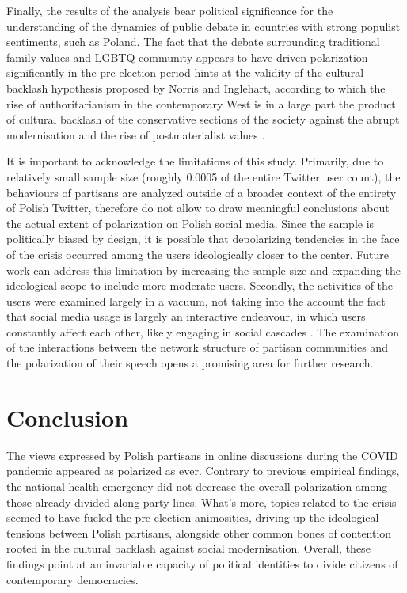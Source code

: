 \documentclass{article}
\begin{document}
	Finally, the results of the analysis bear political significance for the understanding of the dynamics of public debate in countries with strong populist sentiments, such as Poland. The fact that the debate surrounding traditional family values and LGBTQ community appears to have driven polarization significantly in the pre-election period hints at the validity of the cultural backlash hypothesis proposed by Norris and Inglehart, according to which the rise of authoritarianism in the contemporary West is in a large part the product of cultural backlash of the conservative sections of the society against the abrupt modernisation and the rise of postmaterialist values \citep{norris2019}.
	
	It is important to acknowledge the limitations of this study. Primarily, due to relatively small sample size (roughly 0.0005 of the entire Twitter user count), the behaviours of partisans are analyzed outside of a broader context of the entirety of Polish Twitter, therefore do not allow to draw meaningful conclusions about the actual extent of polarization on Polish social media. Since the sample is politically biased by design, it is possible that depolarizing tendencies in the face of the crisis occurred among the users ideologically closer to the center. Future work can address this limitation by increasing the sample size and expanding the ideological scope to include more moderate users. Secondly, the activities of the users were examined largely in a vacuum, not taking into the account the fact that social media usage is largely an interactive endeavour, in which users constantly affect each other, likely engaging in social cascades \citep{sunstein2001, mas2013}. The examination of the interactions between the network structure of partisan communities and the polarization of their speech opens a promising area for further research.
	
	\section*{Conclusion}
	
	The views expressed by Polish partisans in online discussions during the COVID pandemic appeared as polarized as ever. Contrary to previous empirical findings, the national health emergency did not decrease the overall polarization among those already divided along party lines. What’s more, topics related to the crisis seemed to have fueled the pre-election animosities, driving up the ideological tensions between Polish partisans, alongside other common bones of contention rooted in the cultural backlash against social modernisation. Overall, these findings point at an invariable capacity of political identities to divide citizens of contemporary democracies.
	
\end{document}
